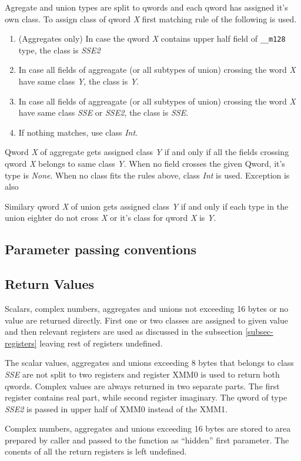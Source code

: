 Agregate and union types are split to qwords and each qword has assigned it's
own class. To assign class of qword \emph{X} first matching rule of the following
is used.
\begin{enumerate}
\item (Aggregates only) In case the qword \emph{X} contains upper half field of
\verb|__m128| type, the class is \emph{SSE2}

\item In case all fields of aggreagate (or all subtypes of union) crossing the
word \emph{X} have same class \emph{Y}, the class is \emph{Y}.

\item In case all fields of aggreagate (or all subtypes of union) crossing the
word \emph{X} have same class \emph{SSE} or \emph{SSE2}, the class is \emph{SSE}.

\item If nothing matches, use class \emph{Int}.
\end{enumerate}

Qword \emph{X} of aggregate gets assigned class \emph{Y} if and only
if all the fields crossing qword \emph{X} belongs to same class \emph{Y}.  When
no field crosses the given Qword, it's type is \emph{None}. When no class fits
the rules above, class \emph{Int} is used.  Exception is also

Similary qword \emph{X} of union gets assigned class \emph{Y} if and only if
each type in the union eighter do not cross \emph{X} or it's class for qword
\emph{X} is \emph{Y}.

\subsection{Parameter passing conventions}

\subsection{Return Values}

Scalars, complex numbers, aggregates and unions not exceeding 16 bytes or no
value are returned directly.  First one or two classes are assigned to given
value and then relevant registers are used as discussed in the subsection
\ref{subsec-registers} leaving rest of registers undefined.

The scalar values, aggregates and unions exceeding 8 bytes that belongs to
class \emph{SSE} are not split to two registers and register XMM0 is used to
return both qwords.  Complex values are always returned in two separate parts.
The first register contains real part, while second register imaginary. The
qword of type \emph{SSE2} is passed in upper half of XMM0 instead of the XMM1.

Complex numbers, aggregates and unions exceeding 16 bytes are stored to area
prepared by caller and passed to the function as ``hidden'' first parameter.
The conents of all the return registers is left undefined.  



